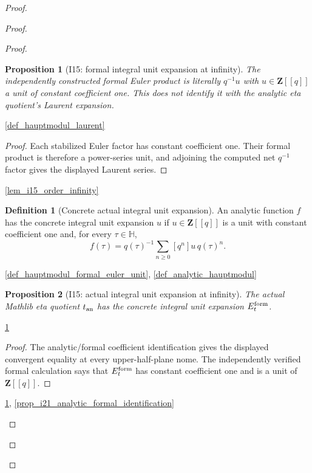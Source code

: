 \documentclass[11pt,a4paper]{article}
\numberwithin{equation}{section}
\theoremstyle{plain}\newtheorem{theorem}{Theorem}[section]\newaliascnt{proposition}{theorem}\newtheorem{proposition}[proposition]{Proposition}\aliascntresetthe{proposition}\newaliascnt{lemma}{theorem}\newtheorem{lemma}[lemma]{Lemma}\aliascntresetthe{lemma}
\theoremstyle{definition}\newaliascnt{definition}{theorem}\newtheorem{definition}[definition]{Definition}\aliascntresetthe{definition}\newaliascnt{notation}{theorem}\newtheorem{notation}[notation]{Notation}\aliascntresetthe{notation}
\providecommand{\lean}[1]{}\providecommand{\leanok}{}
\begin{document}
\begin{proof}
\begin{proof}
\begin{proof}
\begin{proposition}[I15: formal integral unit expansion at infinity]\label{prop_i15_unit_expansion}\lean{SptCM.Repair.hauptmodulFormalLaurent_integralUnitExpansion}\leanok
The independently constructed formal Euler product is literally
$q^{-1}u$ with $u\in\mathbf Z[[q]]$ a unit of constant coefficient one.
This does not identify it with the analytic eta quotient's Laurent expansion.
\end{proposition}
\begin{uses-statement}\ref{def_hauptmodul_laurent}\end{uses-statement}
\begin{proof}
Each stabilized Euler factor has constant coefficient one.  Their formal
product is therefore a power-series unit, and adjoining the computed net
$q^{-1}$ factor gives the displayed Laurent series.
\end{proof}
\begin{uses-proof}\ref{lem_i15_order_infinity}\end{uses-proof}

\begin{definition}[Concrete actual integral unit expansion]\label{def_i15_actual_unit_expansion}\lean{SptCM.Repair.HasActualIntegralUnitExpansion}\leanok
An analytic function $f$ has the concrete integral unit expansion $u$ if
$u\in\mathbf Z[[q]]$ is a unit with constant coefficient one and, for every
$\tau\in\mathbb H$,
\[
 f(\tau)=q(\tau)^{-1}\sum_{n\ge0}[q^n]u\,q(\tau)^n.
\]
\end{definition}
\begin{uses-statement}\ref{def_hauptmodul_formal_euler_unit}, \ref{def_analytic_hauptmodul}\end{uses-statement}

\begin{proposition}[I15: actual integral unit expansion at infinity]\label{prop_i15_actual_unit_expansion}\lean{SptCM.Repair.analyticHauptmodul_hasActualIntegralUnitExpansion}\leanok
The actual Mathlib eta quotient $t_{\rm an}$ has the concrete integral unit
expansion $E_t^{\rm form}$.
\end{proposition}
\begin{uses-statement}\ref{def_i15_actual_unit_expansion}\end{uses-statement}
\begin{proof}
The analytic/formal coefficient identification gives the displayed
convergent equality at every upper-half-plane nome.  The independently
verified formal calculation says that $E_t^{\rm form}$ has constant
coefficient one and is a unit of $\mathbf Z[[q]]$.
\end{proof}
\begin{uses-proof}\ref{prop_i15_unit_expansion}, \ref{prop_i21_analytic_formal_identification}\end{uses-proof}


\end{proof}
\end{proof}
\end{proof}
\end{document}
